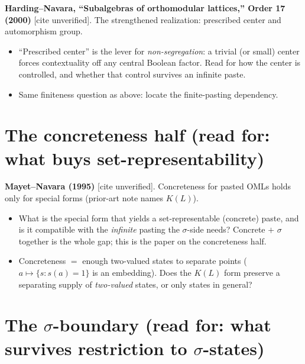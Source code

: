 \documentclass[11pt]{article}
\begin{document}
\noindent\textbf{Harding--Navara, ``Subalgebras of orthomodular lattices,'' Order 17
(2000)} \textup{[cite unverified]}. The strengthened realization: prescribed center and
automorphism group.
\begin{itemize}[leftmargin=*]
  \item ``Prescribed center'' is the lever for \emph{non-segregation}: a trivial (or
    small) center forces contextuality off any central Boolean factor. Read for how the
    center is controlled, and whether that control survives an infinite paste.
  \item Same finiteness question as above: locate the finite-pasting dependency.
\end{itemize}

\section{The concreteness half (read for: what buys set-representability)}

\noindent\textbf{Mayet--Navara (1995)} \textup{[cite unverified]}. Concreteness for
pasted OMLs holds only for special forms (prior-art note names $K(L)$).
\begin{itemize}[leftmargin=*]
  \item What is the special form that yields a set-representable (concrete) paste, and is
    it compatible with the \emph{infinite} pasting the $\sigma$-side needs? Concrete
    $+$ $\sigma$ together is the whole gap; this is the paper on the concreteness half.
  \item Concreteness $=$ enough two-valued states to separate points ($a \mapsto \{s :
    s(a)=1\}$ is an embedding). Does the $K(L)$ form preserve a separating supply of
    \emph{two-valued} states, or only states in general?
\end{itemize}

\section{The $\sigma$-boundary (read for: what survives restriction to $\sigma$-states)}
\end{document}
